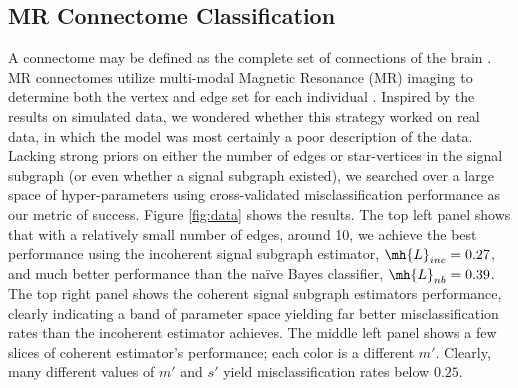 \documentclass[10pt,journal,cspaper,compsoc]{IEEEtran}
\begin{document}

\subsection{MR Connectome Classification} %
\label{sub:mr_connectome_classification}

A connectome may be defined as the complete set of connections of the brain \cite{}.  MR connectomes utilize multi-modal Magnetic Resonance (MR) imaging to determine both the vertex and edge set for each individual \cite{}.  Inspired by the results on simulated data, we wondered whether this strategy worked on real data, in which the model was most certainly a poor description of the data.  Lacking strong priors on either the number of edges or star-vertices in the signal subgraph (or even whether a signal subgraph existed), we searched over a large space of hyper-parameters using cross-validated misclassification performance as our metric of success.  Figure \ref{fig:data} shows the results.  The top left panel shows that with a relatively small number of edges, around 10, we achieve the best performance using the incoherent signal subgraph estimator, $\mh{L}_{inc}=0.27$, and much better performance than the na\"{i}ve Bayes classifier, $\mh{L}_{nb}=0.39$.  The top right panel shows the coherent signal subgraph estimators performance, clearly indicating a band of parameter space yielding far better misclassification rates than the incoherent estimator achieves.  The middle left panel shows a few slices of coherent estimator's performance; each color is a different $m'$.  Clearly, many different values of $m'$ and $s'$ yield misclassification rates below $0.25$.  

\end{document}
